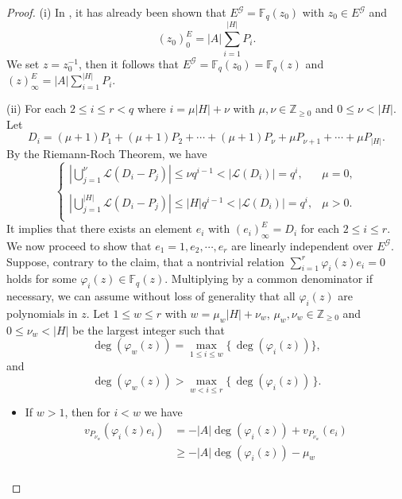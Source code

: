 \documentclass[journal,12pt,onecolumn]{IEEEtran}
\begin{document}
\begin{proof}
    (i) In \cite[Prop. 4.2]{MA2023105686}, it has already been shown that \(E^{\mathcal{G}} = \mathbb{F}_q(z_0)\) with \( z_0\in E^{\mathcal{G}} \) and 
    \[
        (z_0)^{E}_0 = |A|\sum_{i = 1}^{|H|} P_i.
    \]
    We set \( z = z_0^{-1} \), then it follows that \( E^{\mathcal{G}} = \mathbb{F}_q(z_0) = \mathbb{F}_q(z) \) and \( (z)^E_\infty = |A|\sum_{i = 1}^{|H|} P_i \). 

    (ii) For each $2\le i\le r<q$ where \( i = \mu |H| + \nu \) with \( \mu,\nu\in\mathbb{Z}_{\ge0} \) and \( 0\le \nu < |H| \). Let
    \[
        D_i = (\mu + 1)P_1 + (\mu + 1)P_2 + \cdots + (\mu + 1)P_\nu + \mu P_{\nu + 1} + \cdots + \mu P_{|H|}. 
    \]
    By the Riemann-Roch Theorem\cite[Thm. 1.5.15]{Algebraic_Function_Fields_and_Codes}, we have
    \[
        \begin{cases}
            \left|\bigcup\limits_{j=1}^\nu\mathcal{L}(D_i-P_j)\right|\le \nu q^{i-1}<\left|\mathcal{L}(D_i)\right|=q^i,  &\mu = 0,\\
            \\
            \left|\bigcup\limits_{j=1}^{|H|}\mathcal{L}(D_i-P_j)\right|\le |H| q^{i-1}<\left|\mathcal{L}(D_i)\right|=q^i,  &\mu > 0.\\
        \end{cases}
    \]
    It implies that there exists an element \(e_i\) with \( (e_i)^{E}_\infty = D_i \) for each $2\le i\le r$. We now proceed to show that $e_1 = 1,e_2,\cdots,e_r$ are linearly independent over $E^{\mathcal{G}}$. Suppose, contrary to the claim, that a nontrivial relation $\sum_{i=1}^r \varphi_i(z) e_i = 0$ holds for some $\varphi_i(z) \in \mathbb{F}_q(z)$. Multiplying by a common denominator if necessary, we can assume without loss of generality that all $\varphi_i(z)$ are polynomials in $z$. Let $1\le w\le r$ with \( w = \mu_w |H| + \nu_w \), \( \mu_w,\nu_w\in\mathbb{Z}_{\ge0} \) and \( 0\le \nu_w < |H| \) be the largest integer such that 
    \[
        \deg(\varphi_w(z))=\mathop{\max}_{1\le i\le w}\{\,\deg(\varphi_i(z))\},
    \]
    and
    \[
        \deg(\varphi_w(z))>\mathop{\max}_{w< i\le r}\{\,\deg(\varphi_i(z))\,\}.
    \]
    \begin{itemize}
        \item If $w>1$, then for $i<w$ we have
    \begin{align*}
        v_{P_{\nu_w}}(\varphi_i(z)e_i)&=-|A|\deg(\varphi_i(z))+v_{P_{\nu_w}}(e_i)\\
        &\ge-|A|\deg(\varphi_i(z))-\mu_w\\

\end{align*}
\end{itemize}
\end{proof}
\end{document}
